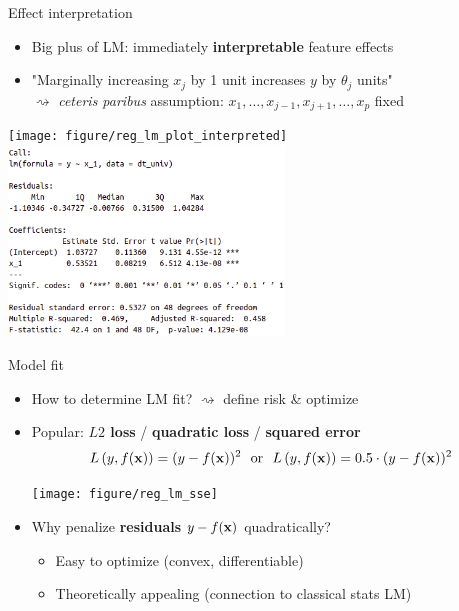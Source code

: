 \documentclass[11pt,compress,t,notes=noshow, xcolor=table]{beamer}
\begin{document}

\begin{vbframe}{Effect interpretation}

\begin{itemize}
    \item Big plus of LM: immediately \textbf{interpretable} feature effects
    \item "Marginally increasing $x_j$ by 1 unit increases $y$ by $\theta_j$ 
    units" \\
    $\rightsquigarrow$ \textit{ceteris paribus} assumption: 
    $x_1, \dots, x_{j - 1}, x_{j + 1}, \dots, x_p$ fixed
\end{itemize}

\vfill
\texttt{[image: figure/reg\_lm\_plot\_interpreted]} 
\hfill
\includegraphics[width=0.55\textwidth]{figure_man/lm_summary} 

\end{vbframe}


\begin{frame}{Model fit}

\begin{itemize}
    \item How to determine LM fit? $\rightsquigarrow$ define risk \& optimize
    \item Popular: \textbf{$L2$ loss} / \textbf{quadratic loss} / 
    \textbf{squared error}
    $$L\left(y, f(\mathbf{x})\right) = (y-f(\mathbf{x}))^2 ~~ \text{or} ~~ L\left(y, f(\mathbf{x})\right) = 0.5 \cdot (y-f(\mathbf{x}))^2$$
    
    \texttt{[image: figure/reg\_lm\_sse]}
    \item Why penalize \textbf{residuals} $y - f(\mathbf{x})$ quadratically?
    \begin{itemize}
        \item Easy to optimize (convex, differentiable)
        \item Theoretically appealing (connection to classical stats LM)
    \end{itemize}
\end{itemize}

\end{frame}
\end{document}
